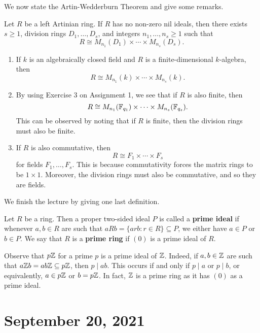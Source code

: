 We now state the Artin-Wedderburn Theorem and give some remarks. 

\begin{theo}{}
Let $R$ be a left Artinian ring. If $R$ has no non-zero nil ideals, then there exists $s \geq 1$, 
division rings $D_1, \dots, D_s$, and integers $n_1, \dots, n_s \geq 1$ such that 
\[ R \cong M_{n_1}(D_1) \times \cdots \times M_{n_s}(D_s). \]
\end{theo}

\begin{remark}{}
\begin{enumerate}[(1)]
    \item If $k$ is an algebraically closed field and $R$ is a finite-dimensional $k$-algebra, then 
    \[ R \cong M_{n_1}(k) \times \cdots \times M_{n_s}(k). \]
    \item By using Exercise 3 on Assignment 1, we see that if $R$ is also finite, then 
    \[ R \cong M_{n_1}(\mathbb{F}_{q_1}) \times \cdots \times M_{n_s}(\mathbb{F}_{q_s}). \]
    This can be observed by noting that if $R$ is finite, then the division rings must also be finite. 
    \item If $R$ is also commutative, then 
    \[ R \cong F_1 \times \cdots \times F_s \]
    for fields $F_1, \dots, F_s$. This is because commutativity forces the matrix rings to be 
    $1 \times 1$. Moreover, the division rings must also be commutative, and so they are fields.
\end{enumerate}
\end{remark}

We finish the lecture by giving one last definition. 

\begin{defn}{}
Let $R$ be a ring. Then a proper two-sided ideal $P$ is called a {\bf prime ideal} if whenever $a, b \in R$
are such that $aRb = \{arb : r \in R\} \subseteq P$, we either have $a \in P$ or $b \in P$.
We say that $R$ is a {\bf prime ring} if $(0)$ is a prime ideal of $R$. 
\end{defn}

\begin{exmp}{}
Observe that $p\mathbb{Z}$ for a prime $p$ is a prime ideal of $\mathbb{Z}$. Indeed, if $a, b \in \mathbb{Z}$ are such that 
$a\mathbb{Z} b = ab\mathbb{Z} \subseteq p\mathbb{Z}$, then $p \mid ab$. This occurs if and only if $p \mid a$ or $p \mid b$, 
or equivalently, $a \in p\mathbb{Z}$ or $b = p\mathbb{Z}$. In fact, $\mathbb{Z}$ is a prime ring as it has $(0)$ as a prime 
ideal. 
\end{exmp}

\section{September 20, 2021}

